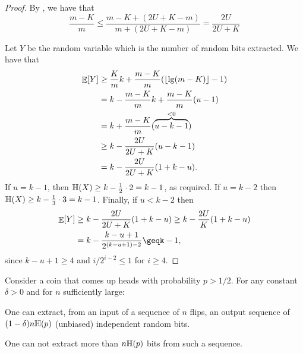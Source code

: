 \begin{proof}
    By , we have that
    \begin{equation*}
        \frac{m-K}{m}%
        \leq 
        \frac{m-K + (2U + K -m)}{m+ (2U + K -m)}%
        =%
        \frac{2U}{2U + K}
    \end{equation*}


    \smallskip%
    Let $Y$ be the random variable which is the number of random bits
    extracted. We have that
    \begin{align*}
      \Ex{Y}%
      &\geq
        \frac{K}{m} k + \frac{m-K}{m}\pth{ \floor{
        \lg (m-K)} -1}
        \\&=
        k - \frac{m - K}{m} k + \frac{m-K}{m}\pth{ u -1}
        \\&=
        k + \frac{m-K}{m} (\overbrace{u -k-1}^{<0} )\\
      &\geq 
        k - \frac{2U}{2U + K}\pth{ u -k-1}
        \\&= 
        k - \frac{2U}{2U+ K}\pth{ 1 + k - u}.
    \end{align*}
   If $u = k-1$, then $\Entropy{X} \geq k - \frac{1}{2} \cdot 2 = k-1$,
   as required. If $u = k-2$ then $\Entropy{X} \geq k - \frac{1}{3}
   \cdot 3 = k - 1$. Finally, if $u < k-2$ then
   \begin{align*}
       \Ex{Y}
       &\geq
       k - \frac{2U}{2U+ K}\pth{ 1 + k - u}
       \geq k - \frac{2U}{K}\pth{ 1 + k - u}%
       \\&=%
       k - \frac{k - u+1}{2^{(k-u+1) - 2}}%
       \geq%
       k-1,
   \end{align*}
   since $k-u+1 \geq 4$ and $ {i}/{2^{i-2}} \leq 1$ for $i \geq 4$.
\end{proof}

\begin{theorem}
    Consider a coin that comes up heads with probability $p >1/2$. For
    any constant $\delta >0$ and for $n$ sufficiently large:
    \begin{compactenumA}
        \item One can extract, from an input of a sequence of $n$
        flips, an output sequence of $(1-\delta)n\Entropy{p}$
        (unbiased) independent random bits.

        \smallskip%
        \item One can not extract more than $n \Entropy{p}$ bits from
        such a sequence.
    \end{compactenumA}
\end{theorem}

